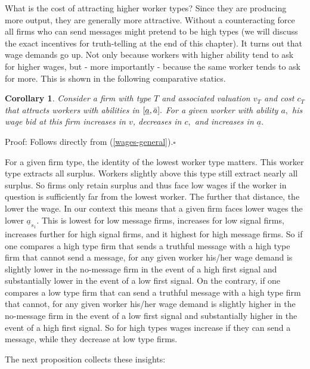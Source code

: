 \documentclass[12pt]{article}
\theoremstyle{plain}
\newtheorem{corollary}[theorem]{Corollary}
\begin{document}
What is the cost of attracting higher worker types? Since they are producing
more output, they are generally more attractive. Without a counteracting
force all firms who can send messages might pretend to be high types (we
will discuss the exact incentives for truth-telling at the end of this
chapter). It turns out that wage demands go up. Not only because workers
with higher ability tend to ask for higher wages, but - more importantly -
because the same worker tends to ask for more. This is shown in the
following comparative statics.

\begin{corollary}
\label{corollary 2}Consider a firm with type $T$ and associated valuation $%
v_{T}$ and cost $c_{T}$ that attracts workers with abilities in $[\underline{%
a},\bar{a}].$ For a given worker with ability $a,$ his wage bid at this firm
increases in $v$, decreases in $c,$ and increases in $\underline{a}.$
\end{corollary}

Proof: Follows directly from (\ref{wages-general}).$\square $

\bigskip

For a given firm type, the identity of the lowest worker type matters. This
worker type extracts all surplus. Workers slightly above this type still
extract nearly all surplus. So firms only retain surplus and thus face low
wages if the worker in question is sufficiently far from the lowest worker.
The further that distance, the lower the wage. In our context this means
that a given firm faces lower wages the lower $\underline{a}_{s_{1}}.$ This
is lowest for low message firms, increases for low signal firms, increases
further for high signal firms, and it highest for high message firms. So if
one compares a high type firm that sends a truthful message with a high type
firm that cannot send a message, for any given worker his/her wage demand is
slightly lower in the no-message firm in the event of a high first signal
and substantially lower in the event of a low first signal. On the contrary,
if one compares a low type firm that can send a truthful message with a high
type firm that cannot, for any given worker his/her wage demand is slightly
higher in the no-message firm in the event of a low first signal and
substantially higher in the event of a high first signal. So for high types
wages increase if they can send a message, while they decrease at low type
firms.

The next proposition collects these insights:
\end{document}
